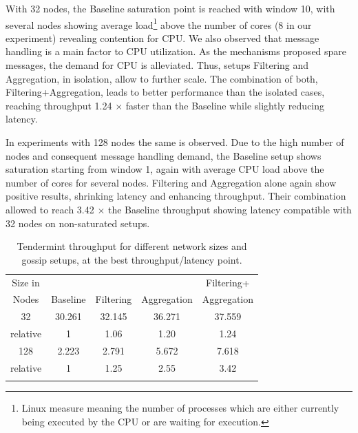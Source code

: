 With 32 nodes, the Baseline saturation point is reached with window 10, with several nodes showing average load\footnote{Linux measure meaning the number of processes which are either currently being executed by the CPU or are waiting for execution.} above the number of cores (8 in our experiment) revealing contention for CPU.  We also observed that  message handling is a main factor to CPU utilization.
%
As the mechanisms proposed spare messages, the demand for CPU is alleviated.   Thus, setups Filtering and Aggregation, in isolation, allow to further scale.  The combination of both, Filtering+Aggregation, leads to better performance than the isolated cases, reaching throughput 
1.24 $\times$ faster than the Baseline while slightly reducing latency.     

In experiments with 128 nodes the same is observed.  Due to the high number of nodes and consequent message handling demand, the Baseline setup shows saturation starting from window 1, again with average CPU load above the number of cores for several nodes.  Filtering and Aggregation alone again show positive results, shrinking latency and enhancing throughput.   Their combination allowed to reach 3.42 $\times$ the Baseline throughput showing latency compatible with 32 nodes on non-saturated setups.

\begin{table}[h!]
\centering
	\begin{tabular}{c c c c c }
	\hline
     Size in     &        &       &       & Filtering+  \\ 
	 Nodes & Baseline   & Filtering    & Aggregation    & Aggregation  \\  \hline
	32  		& 		30.261		&	32.145	&	36.271	&  37.559 \\
	relative   		& 		  1		&	1.06	&	1.20	&  1.24      \\ \hline
	128  		& 		2.223		&	2.791	&	5.672	&  7.618  \\  
	relative   		& 		  1		&	1.25	&	2.55	&  3.42  \\ \hline \\
 
	\end{tabular}
	\caption{Tendermint throughput for different network sizes and  gossip setups, at the best throughput/latency point.}
 \label{tab:sturationPoints}
 \vspace{-5mm}
\end{table}


